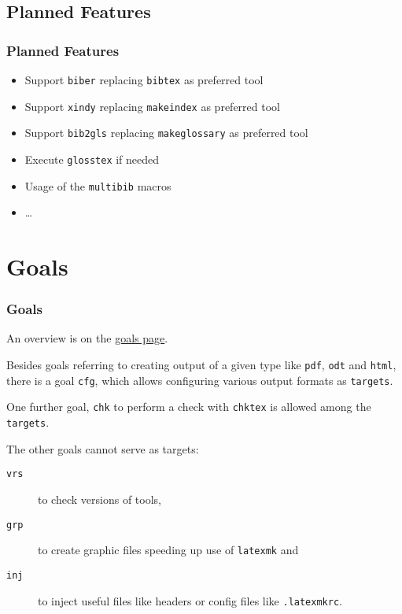 \subsection{Planned Features}

\begin{frame}
  \frametitle{Planned Features}
  \begin{itemize}
  \item Support \texttt{biber} replacing \texttt{bibtex} as preferred tool
  \item Support \texttt{xindy} replacing \texttt{makeindex} as preferred tool
  \item Support \texttt{bib2gls} replacing \texttt{makeglossary} as preferred tool
  \item Execute \texttt{glosstex} if needed
  \item Usage of the \texttt{multibib} macros
  \item \dots
  \end{itemize}
\end{frame}


\section{Goals}

\begin{frame}
  \frametitle{Goals}

  An overview is on the 
  \href{http://simuline.eu/LatexMavenPlugin/plugin-info.html}{goals page}. 
  
  Besides goals referring to creating output of a given type 
  like \alert{\texttt{pdf}}, \alert{\texttt{odt}} and \alert{\texttt{html}}, 
  there is a goal \alert{\texttt{cfg}}, 
  which allows 
  \alert con\alert fi\alert guring various output formats as \texttt{targets}. %
  
  One further goal, \alert{\texttt{chk}} to perform a check with \texttt{chktex} 
  is allowed among the \texttt{targets}. 

  The other goals cannot serve as targets: 
  \begin{description}
    \item[\texttt{vrs}] to check versions of tools, 
    \item[\texttt{grp}] to create graphic files speeding up use of \texttt{latexmk} 
    and 
    \item[\texttt{inj}] to inject useful files like headers or config files 
    like \texttt{.latexmkrc}. 
  \end{description}
\end{frame}

